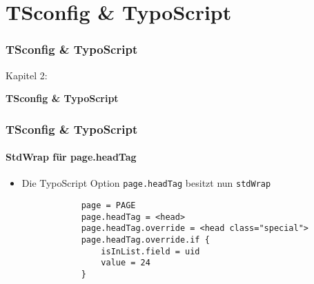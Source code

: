 %

\section{TSconfig \& TypoScript}
\begin{frame}[fragile]
	\frametitle{TSconfig \& TypoScript}

	\begin{center}\huge{Kapitel 2:}\end{center}
	\begin{center}\huge{\color{typo3darkgrey}\textbf{TSconfig \& TypoScript}}\end{center}

\end{frame}


\begin{frame}[fragile]
	\frametitle{TSconfig \& TypoScript}
	\framesubtitle{StdWrap für page.headTag}

	\begin{itemize}
		\item Die TypoScript Option \texttt{page.headTag} besitzt nun \texttt{stdWrap}
		\begin{lstlisting}
			page = PAGE
			page.headTag = <head>
			page.headTag.override = <head class="special">
			page.headTag.override.if {
	  			isInList.field = uid
	  			value = 24
			}
		\end{lstlisting}	

	\end{itemize}

\end{frame}

